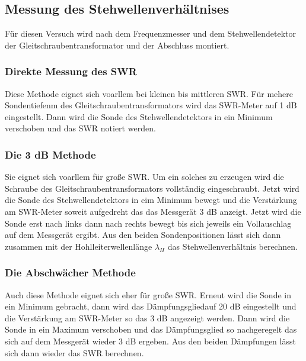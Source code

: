 \subsection{Messung des Stehwellenverhältnises}
\label{sec:dfswr}
Für diesen Versuch wird nach dem Frequenzmesser und dem Stehwellendetektor der Gleitschraubentransformator und
der Abschluss montiert.

\subsubsection{Direkte Messung des SWR}
\label{sec:dfswrdirekt}
Diese Methode eignet sich voarllem bei kleinen bis mittleren SWR. Für mehere Sondentiefenm des 
Gleitschraubentransformators wird das SWR-Meter auf 1 dB eingestellt. Dann wird die Sonde des Stehwellendetektors
in ein Minimum verschoben und das SWR notiert werden.

\subsubsection{Die 3 dB Methode}
\label{sec:dfdreidb}
Sie eignet sich voarllem für große SWR. Um ein solches zu erzeugen wird die Schraube des Gleitschraubentransformators
vollständig eingeschraubt. Jetzt wird die Sonde des Stehwellendetektors in eim Minimum bewegt und die Verstärkung
am SWR-Meter soweit aufgedreht das das Messgerät 3 dB anzeigt. Jetzt wird die Sonde erst nach links dann nach rechts
bewegt bis sich jeweils ein Vollauschlag auf dem Messgerät ergibt. Aus den beiden Sondenpositionen lässt sich dann
zusammen mit der Hohlleiterwellenlänge $\lambda_H$ das Stehwellenverhältnis berechnen.

\subsubsection{Die Abschwächer Methode}
\label{sec:dfabschwaecher}
Auch  diese Methode eignet sich eher für große SWR. Erneut wird die Sonde in ein Minimum gebracht, dann wird das 
Dämpfungsgliedauf 20 dB eingestellt und die Verstärkung am SWR-Meter so das 3 dB angezeigt werden. Dann wird 
die Sonde in ein Maximum verschoben und das Dämpfungsglied so nachgeregelt das sich auf dem Messgerät wieder 3 dB 
ergeben. Aus den beiden Dämpfungen lässt sich dann wieder das SWR berechnen.